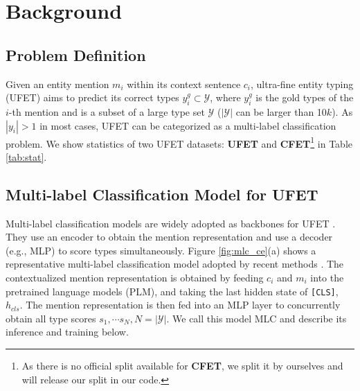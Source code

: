 \section{Background}
\subsection{Problem Definition}
Given an entity mention $m_i$ within its context sentence $c_i$, ultra-fine entity typing (UFET) aims to predict its correct types $y^g_i \subset \mathcal{Y}$, where $y_i^g$ is the gold types of the $i$-th mention and is a subset of a large type set $\mathcal{Y}$ ($|\mathcal{Y}|$ can be larger than 10$k$). As $|y_i| > 1$ in most cases, UFET can be categorized as a multi-label classification problem. We show statistics of two UFET datasets: {\bf \textsc{UFET}} \cite{ufet} and {\bf \textsc{CFET}}\footnote{As there is no official split available for {\bf \textsc{CFET}}, we split it by ourselves and will release our split in our code.} \cite{cfet} in Table \ref{tab:stat}.

\begin{table}[t]
\caption{$\text{avg}(\vert y_i^g \vert)$ denotes the average number of gold types per instance, ZH for Chinese.}
\label{tab:stat}
\end{table}

\subsection{Multi-label Classification Model for UFET}
\label{sec:mlc}
Multi-label classification models are widely adopted as backbones for UFET \cite{ufet, onoe-durrett-2019-learning, box4types}. They use an encoder to obtain the mention representation and use a decoder (e.g., MLP) to score types simultaneously. Figure \ref{fig:mlc_ce}(a) shows a representative multi-label classification model adopted by recent methods \cite{npcrf,mlmet}. The contextualized mention representation is obtained by feeding $c_i$ and $m_i$ into the pretrained language models (PLM), and taking the last hidden state of {\tt [CLS]}, $h_{cls}$. The mention representation is then fed into an MLP layer to concurrently obtain all type scores $s_1, \cdots s_N, N=|\mathcal{Y}|$. We call this model MLC and describe its inference and training below. 
